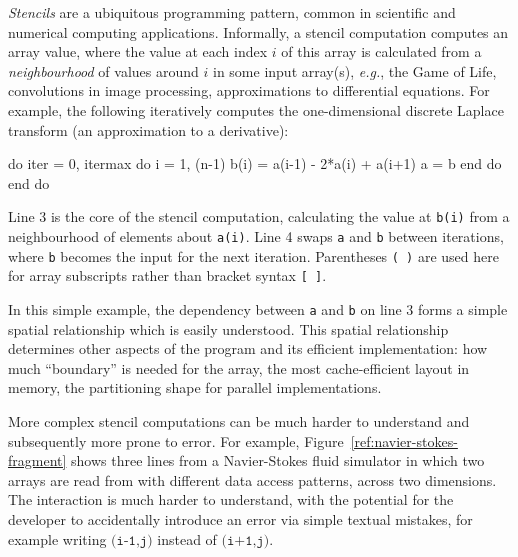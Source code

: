 \documentclass[9pt]{sigplanconf}
\theoremstyle{definition}
\newcommand{\eg}{\emph{e.g.}}
\begin{document}
\emph{Stencils} are a ubiquitous programming pattern, common in
scientific and numerical computing applications. Informally, a stencil
computation computes an array value, where the value at each index $i$ of
this array is calculated from a \emph{neighbourhood} of values around $i$ in
some input array(s), \eg{}, the Game of Life, convolutions in image
processing, approximations to differential equations. For example, the
following iteratively computes the one-dimensional discrete Laplace
transform (an approximation to a derivative): 
%
\begin{ExmVerbatim}
do iter = 0, itermax
   do i = 1, (n-1)
      b(i) = a(i-1) - 2*a(i) + a(i+1)
   a = b
   end do
end do
\end{ExmVerbatim}
%
Line 3 is the core of the stencil computation, calculating
the value at \texttt{b(i)} from a neighbourhood of elements about
\texttt{a(i)}. Line 4 swaps
\texttt{a} and \texttt{b} between iterations, where \texttt{b} becomes the
input for the next iteration. Parentheses 
\texttt{( )} are used here for 
array subscripts rather than bracket syntax \texttt{[ ]}. 

In this simple example, the dependency between \texttt{a}
and \texttt{b} on line 3 forms a simple spatial relationship which is easily
understood. This spatial relationship determines other aspects of the
program and its efficient implementation: how much ``boundary'' is
needed for the array, the most cache-efficient layout in memory,
the partitioning shape for parallel implementations. 

More complex stencil computations can be much harder to understand and
subsequently more prone to error. For example,
Figure~\ref{ref:navier-stokes-fragment} shows three lines from a
Navier-Stokes fluid simulator in which two arrays are read from with
different data access patterns, across two dimensions. The interaction
is much harder to understand, with the potential for the developer to
accidentally introduce an error via simple textual mistakes, for
example writing $\texttt{(i-1,j)}$ instead of $\texttt{(i+1,j)}$.
\end{document}
